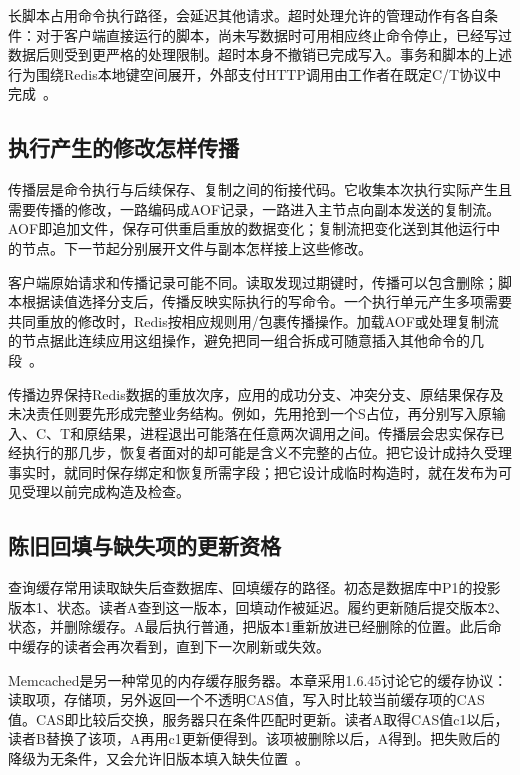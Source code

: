 长脚本占用命令执行路径，会延迟其他请求。超时处理允许的管理动作有各自条件：对于客户端直接运行的脚本，尚未写数据时可用相应终止命令停止，已经写过数据后则受到更严格的处理限制。超时本身不撤销已完成写入。事务和脚本的上述行为围绕Redis本地键空间展开，外部支付HTTP调用由工作者在既定C/T协议中完成~\cite{redis8102-source}。

\subsection{执行产生的修改怎样传播}

传播层是命令执行与后续保存、复制之间的衔接代码。它收集本次执行实际产生且需要传播的修改，一路编码成AOF记录，一路进入主节点向副本发送的复制流。AOF即追加文件，保存可供重启重放的数据变化；复制流把变化送到其他运行中的节点。下一节起分别展开文件与副本怎样接上这些修改。

客户端原始请求和传播记录可能不同。读取发现过期键时，传播可以包含删除；脚本根据读值选择分支后，传播反映实际执行的写命令。一个执行单元产生多项需要共同重放的修改时，Redis按相应规则用/包裹传播操作。加载AOF或处理复制流的节点据此连续应用这组操作，避免把同一组合拆成可随意插入其他命令的几段~\cite{redis8102-source}。


传播边界保持Redis数据的重放次序，应用的成功分支、冲突分支、原结果保存及未决责任则要先形成完整业务结构。例如，先用抢到一个S占位，再分别写入原输入、C、T和原结果，进程退出可能落在任意两次调用之间。传播层会忠实保存已经执行的那几步，恢复者面对的却可能是含义不完整的占位。把它设计成持久受理事实时，就同时保存绑定和恢复所需字段；把它设计成临时构造时，就在发布为可见受理以前完成构造及检查。

\subsection{陈旧回填与缺失项的更新资格}

查询缓存常用读取缺失后查数据库、回填缓存的路径。初态是数据库中P1的投影版本1、状态。读者A查到这一版本，回填动作被延迟。履约更新随后提交版本2、状态，并删除缓存。A最后执行普通，把版本1重新放进已经删除的位置。此后命中缓存的读者会再次看到，直到下一次刷新或失效。


Memcached是另一种常见的内存缓存服务器。本章采用1.6.45讨论它的缓存协议：读取项，存储项，另外返回一个不透明CAS值，写入时比较当前缓存项的CAS值。CAS即比较后交换，服务器只在条件匹配时更新。读者A取得CAS值c1以后，读者B替换了该项，A再用c1更新便得到。该项被删除以后，A得到。把失败后的降级为无条件，又会允许旧版本填入缺失位置~\cite{memcached1645-protocol}。

